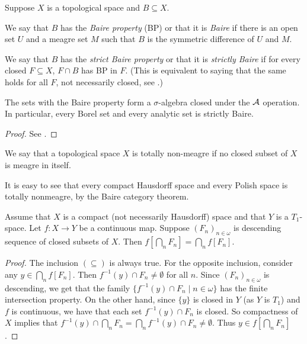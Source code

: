	
	\begin{dfn}
		Suppose $X$ is a topological space and $B\subseteq X$.
		
		We say that $B$ has the \emph{Baire property} (BP) or that it is \emph{Baire} if there is an open set $U$ and a meagre set $M$ such that $B$ is the symmetric difference of $U$ and $M$.
		
		We say that $B$ has the \emph{strict Baire property} or that it is \emph{strictly Baire} if for every closed $F\subseteq X$, $F\cap B$ has BP in $F$. (This is equivalent to saying that the same holds for all $F$, not necessarily closed, see \cite[§11 VI.]{Ku}.)\xqed{\lozenge}
	\end{dfn}
	
	\begin{fct}
		The sets with the Baire property form a $\sigma$-algebra closed under the $\operatorname{{\mathcal A}}$ operation. In particular, every Borel set and every analytic set is strictly Baire.
	\end{fct}
	\begin{proof}
		See \cite[Theorem 25.3]{Arh}.
	\end{proof}
	
	\begin{dfn}
		\index{totally non-meagre}
		We say that a topological space $X$ is totally non-meagre if no closed subset of $X$ is meagre in itself.\xqed{\lozenge}
	\end{dfn}
	
	\begin{rem}
		It is easy to see that every compact Hausdorff space and every Polish space is totally nonmeagre, by the Baire category theorem. \xqed{\lozenge}
	\end{rem}
	
	
	\begin{prop}\label{prop: image of intersection}
		Assume that $X$ is a compact (not necessarily Hausdorff) space and that $Y$ is a $T_1$-space. Let $f\colon X \to Y$ be a continuous map. Suppose $(F_n)_{n\in \omega}$ is descending sequence of closed subsets of $X$. Then $f[\bigcap_n F_n]=\bigcap_n f[F_n]$.
	\end{prop}
	\begin{proof}
		The inclusion $(\subseteq)$ is always true. For the opposite inclusion, consider any $y \in \bigcap_n f[F_n]$. Then $f^{-1}(y) \cap F_n \ne \emptyset$ for all $n$. Since $(F_n)_{n\in \omega}$ is descending, we get that the family $\{f^{-1}(y) \cap F_n\mid n \in \omega\}$ has the finite intersection property. On the other hand, since $\{y\}$ is closed in $Y$ (as $Y$ is $T_1$) and $f$ is continuous, we have that each set $f^{-1}(y) \cap F_n$ is closed. So compactness of $X$ implies that $f^{-1}(y) \cap \bigcap_n F_n=\bigcap_n f^{-1}(y) \cap F_n \ne \emptyset$. Thus $y \in f[\bigcap_n F_n]$.
	\end{proof}
	
